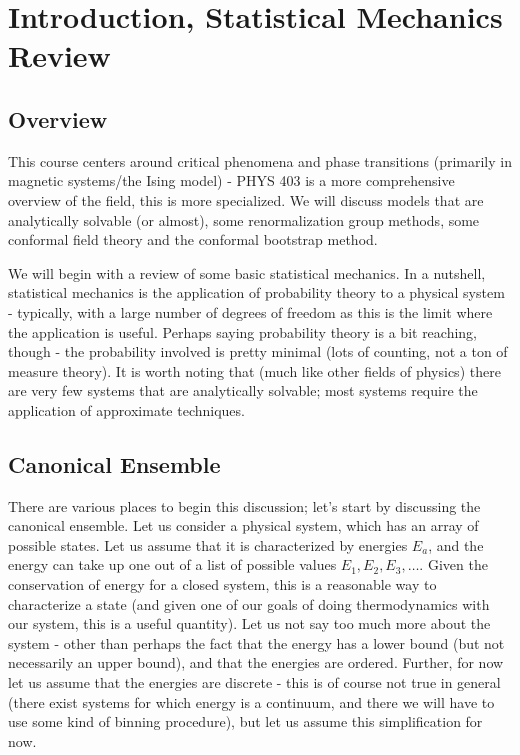 \section{Introduction, Statistical Mechanics Review}

\subsection{Overview}
This course centers around critical phenomena and phase transitions (primarily in magnetic systems/the Ising model) - PHYS 403 is a more comprehensive overview of the field, this is more specialized. We will discuss models that are analytically solvable (or almost), some renormalization group methods, some conformal field theory and the conformal bootstrap method.

We will begin with a review of some basic statistical mechanics. In a nutshell, statistical mechanics is the application of probability theory to a physical system - typically, with a large number of degrees of freedom as this is the limit where the application is useful. Perhaps saying probability theory is a bit reaching, though - the probability involved is pretty minimal (lots of counting, not a ton of measure theory). It is worth noting that (much like other fields of physics) there are very few systems that are analytically solvable; most systems require the application of approximate techniques.

\subsection{Canonical Ensemble}
There are various places to begin this discussion; let's start by discussing the canonical ensemble. Let us consider a physical system, which has an array of possible states. Let us assume that it is characterized by energies $E_a$, and the energy can take up one out of a list of possible values $E_1, E_2, E_3, \ldots$. Given the conservation of energy for a closed system, this is a reasonable way to characterize a state (and given one of our goals of doing thermodynamics with our system, this is a useful quantity). Let us not say too much more about the system - other than perhaps the fact that the energy has a lower bound (but not necessarily an upper bound), and that the energies are ordered. Further, for now let us assume that the energies are discrete - this is of course not true in general (there exist systems for which energy is a continuum, and there we will have to use some kind of binning procedure), but let us assume this simplification for now.

